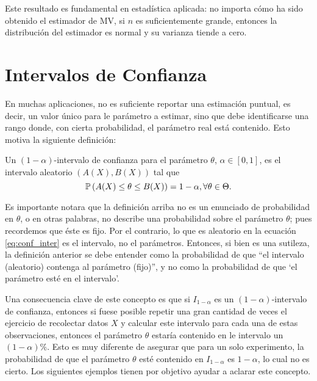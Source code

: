 Este resultado es fundamental en estadística aplicada: no importa cómo ha sido obtenido el estimador de MV, si $n$ es suficientemente grande, entonces la distribución del estimador es normal y su varianza tiende a cero. 
\section{Intervalos de Confianza} 

En muchas aplicaciones, no es suficiente reportar una estimación puntual, es decir, un valor único para le parámetro a estimar, sino que debe identificarse una rango donde, con cierta probabilidad, el parámetro real está contenido. Esto motiva la siguiente definición: 

\begin{definition}
\label{def:conf_inter} Un $(1-\alpha)$-intervalo de confianza para el parámetro $\theta$, $\alpha\in[0,1]$, es el intervalo aleatorio $(A(X),B(X))$ tal que 
\begin{equation}
	\label{eq:conf_inter}
	\mathbb{P} \left(A(X)\leq\theta\leq B(X)\right) = 1-\alpha, \forall \theta\in\Theta.
\end{equation}
\end{definition}

\begin{remark}
	Es importante notara que la definición arriba no es un enunciado de probabilidad en $\theta$, o en otras palabras, no describe una probabilidad sobre el parámetro $\theta$; pues recordemos que éste es fijo. Por el contrario, lo que es aleatorio en la ecuación \eqref{eq:conf_inter} es el intervalo, no el parámetros. Entonces, si bien es una sutileza, la definición anterior se debe entender como la probabilidad de que ``el intervalo (aleatorio) contenga al parámetro (fijo)'', y no como la probabilidad de que `el parámetro esté en el intervalo'. 
\end{remark}
Una consecuencia clave de este concepto es que si $I_{1-\alpha}$ es un $(1-\alpha)$-intervalo de confianza, entonces si fuese posible repetir una gran cantidad de veces el ejercicio de recolectar datos $X$ y calcular este intervalo para cada una de estas observaciones, entonces el parámetro $\theta$ estaría contenido en le intervalo un $(1-\alpha)\%$. Esto es muy diferente de asegurar que para un solo experimento, la probabilidad de que el parámetro $\theta$ esté contenido en $I_{1-\alpha}$ es $1-\alpha$, lo cual no es cierto. Los siguientes ejemplos tienen por objetivo ayudar a aclarar este concepto.

